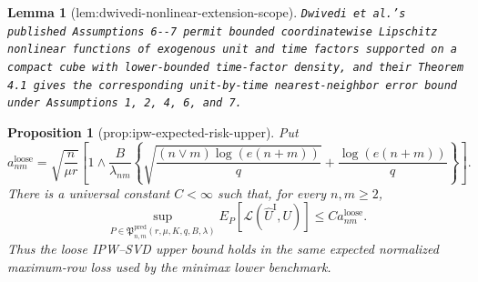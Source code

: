 \documentclass{article}
\newtheorem{lemma}{Lemma}
\newtheorem{proposition}{Proposition}
\begin{document}
\begin{lemma}[lem:dwivedi-nonlinear-extension-scope]\label{lem:dwivedi-nonlinear-extension-scope}
\texttt{Dwivedi et al.'s published Assumptions 6-\allowbreak{}-\allowbreak{}7 permit bounded coordinatewise Lipschitz nonlinear functions of exogenous unit and time factors supported on a compact cube with lower-\allowbreak{}bounded time-\allowbreak{}factor density,\allowbreak{} and their Theorem 4.1 gives the corresponding unit-\allowbreak{}by-\allowbreak{}time nearest-\allowbreak{}neighbor error bound under Assumptions 1,\allowbreak{} 2,\allowbreak{} 4,\allowbreak{} 6,\allowbreak{} and 7.}
\end{lemma}

\begin{proposition}[prop:ipw-expected-risk-upper]\label{prop:ipw-expected-risk-upper}
Put
\[
 a^{\mathrm{loose}}_{nm}=
 \sqrt{\frac n{\mu r}}\left[1\wedge
 \frac B{\lambda_{nm}}\left\{
 \sqrt{\frac{(n\vee m)\log(e(n+m))}{q}}+
 \frac{\log(e(n+m))}{q}\right\}\right].
\]
There is a universal constant \(C<\infty\) such that, for every \(n,m\ge2\),
\[
 \sup_{P\in\mathfrak P^{\mathrm{pred}}_{n,m}(r,\mu,K,q,B,\lambda)}
 E_P\!\left[\mathcal L(\widehat U^{\mathrm I},U)\right]
 \le C a^{\mathrm{loose}}_{nm}.
\]
Thus the loose IPW--SVD upper bound holds in the same expected normalized maximum-row loss used by the minimax lower benchmark.
\end{proposition}
\end{document}

